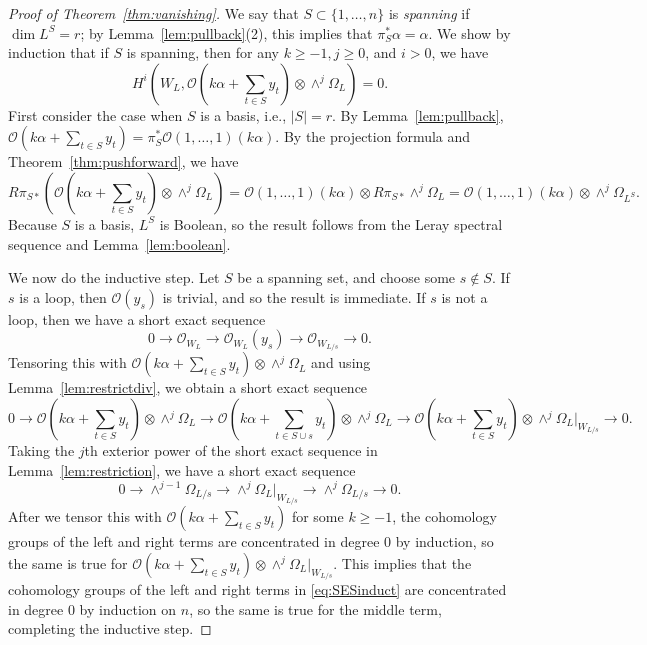 \documentclass{amsart}
\theoremstyle{definition}
\begin{document}
\begin{proof}[Proof of Theorem~\ref{thm:vanishing}]
We say that $S \subset \{1, \dotsc, n\}$ is \emph{spanning} if $\dim L^S = r$; by Lemma~\ref{lem:pullback}(2), this implies that $\pi_S^* \alpha = \alpha$. We show by induction that if $S$ is spanning, then for any $k \ge -1, j \ge 0$, and $i > 0$, we have
\begin{equation}\label{eq:vanish}
H^i(W_L, \mathcal{O}(k \alpha + \sum_{t \in S} y_t) \otimes \wedge^j \Omega_L) = 0.  
\end{equation}
First consider the case when $S$ is a basis, i.e., $|S| = r$. By Lemma~\ref{lem:pullback}, $\mathcal{O}(k \alpha + \sum_{t \in S} y_t) = \pi_S^* \mathcal{O}(1, \dotsc, 1)(k \alpha)$. By the projection formula and Theorem~\ref{thm:pushforward}, we have
$$R \pi_{S*} (\mathcal{O}(k \alpha + \sum_{t \in S} y_t) \otimes \wedge^j 
\Omega_L) = \mathcal{O}(1, \dotsc, 1)(k \alpha) \otimes R\pi_{S*} 
\wedge^j \Omega_L = \mathcal{O}(1, \dotsc, 1)(k\alpha) \otimes \wedge^j 
\Omega_{L^S}.$$
Because $S$ is a basis, $L^S$ is Boolean, so the result follows from the Leray spectral sequence and Lemma~\ref{lem:boolean}. 

We now do the inductive step. Let $S$ be a spanning set, and choose some $s \not \in S$. 
If $s$ is a loop, then $\mathcal{O}(y_s)$ is trivial, and so the result is immediate. 
If $s$ is not a loop, then we have a short exact sequence
$$0 \to \mathcal{O}_{W_L} \to \mathcal{O}_{W_L}(y_s) \to \mathcal{O}_{W_{L/s}} \to 0.$$
Tensoring this with $\mathcal{O}(k \alpha + \sum_{t \in S} y_t) \otimes \wedge^j \Omega_L$ and using Lemma~\ref{lem:restrictdiv}, we obtain a short exact sequence
\begin{equation}\label{eq:SESinduct}
0 \to \mathcal{O}(k \alpha + \sum_{t \in S} y_t) \otimes 
\wedge^j \Omega_L \to  \mathcal{O}(k \alpha + \sum_{t \in S \cup s} 
    y_t) \otimes \wedge^j \Omega_L \to \mathcal{O}(k \alpha + 
        \sum_{t \in S} y_t) \otimes \wedge^j \Omega_{L}|_{W_{L/s}} \to 0.
\end{equation}
Taking the $j$th exterior power of the short exact sequence in Lemma~\ref{lem:restriction}, we have a short exact sequence
$$0 \to \wedge^{j-1} \Omega_{L/s} \to \wedge^j \Omega_{L}|_{W_{L/s}} \to \wedge^j \Omega_{L/s} \to 0.$$
After we tensor this with $\mathcal{O}(k\alpha + \sum_{t \in S} y_t)$ for some $k \ge -1$, the cohomology groups of the left and right terms are concentrated in degree $0$ by induction, so the same is true for $\mathcal{O}(k \alpha + \sum_{t \in S} y_t) \otimes \wedge^j \Omega_L|_{W_{L/s}}$. 
This implies that the cohomology groups of the left and right terms in \eqref{eq:SESinduct} are concentrated in degree $0$ by induction on $n$, so the same is true for the middle term, completing the inductive step. 
\end{proof}
\end{document}
